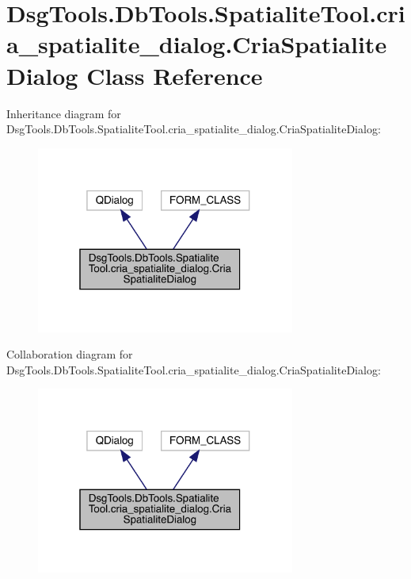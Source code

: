\hypertarget{class_dsg_tools_1_1_db_tools_1_1_spatialite_tool_1_1cria__spatialite__dialog_1_1_cria_spatialite_dialog}{}\section{Dsg\+Tools.\+Db\+Tools.\+Spatialite\+Tool.\+cria\+\_\+spatialite\+\_\+dialog.\+Cria\+Spatialite\+Dialog Class Reference}
\label{class_dsg_tools_1_1_db_tools_1_1_spatialite_tool_1_1cria__spatialite__dialog_1_1_cria_spatialite_dialog}


Inheritance diagram for Dsg\+Tools.\+Db\+Tools.\+Spatialite\+Tool.\+cria\+\_\+spatialite\+\_\+dialog.\+Cria\+Spatialite\+Dialog\+:
\nopagebreak
\begin{figure}[H]
\begin{center}
\leavevmode
\includegraphics[width=241pt]{class_dsg_tools_1_1_db_tools_1_1_spatialite_tool_1_1cria__spatialite__dialog_1_1_cria_spatialite_dialog__inherit__graph}
\end{center}
\end{figure}


Collaboration diagram for Dsg\+Tools.\+Db\+Tools.\+Spatialite\+Tool.\+cria\+\_\+spatialite\+\_\+dialog.\+Cria\+Spatialite\+Dialog\+:
\nopagebreak
\begin{figure}[H]
\begin{center}
\leavevmode
\includegraphics[width=241pt]{class_dsg_tools_1_1_db_tools_1_1_spatialite_tool_1_1cria__spatialite__dialog_1_1_cria_spatialite_dialog__coll__graph}
\end{center}
\end{figure}
